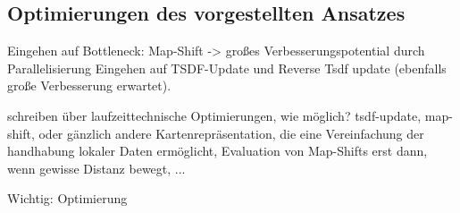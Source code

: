 \subsection{Optimierungen des vorgestellten Ansatzes}


Eingehen auf Bottleneck: Map-Shift -> großes Verbesserungspotential durch Parallelisierung
Eingehen auf TSDF-Update und Reverse Tsdf update (ebenfalls große Verbesserung erwartet).

schreiben über laufzeittechnische Optimierungen, wie möglich?
tsdf-update, map-shift, oder gänzlich andere Kartenrepräsentation, die eine Vereinfachung der handhabung lokaler Daten ermöglicht, Evaluation von Map-Shifts erst dann, wenn gewisse Distanz bewegt, ...

Wichtig: Optimierung
